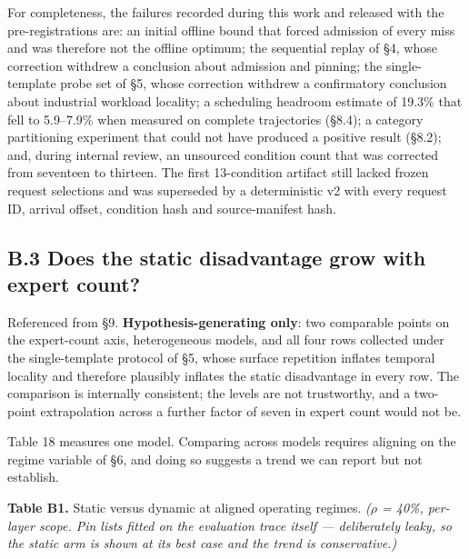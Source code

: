 \documentclass[
  10pt,
  letterpaper,
  10pt]{article}
\begin{document}
For completeness, the failures recorded during this work and released
with the pre-registrations are: an initial offline bound that forced
admission of every miss and was therefore not the offline optimum; the
sequential replay of §4, whose correction withdrew a conclusion about
admission and pinning; the single-template probe set of §5, whose
correction withdrew a confirmatory conclusion about industrial workload
locality; a scheduling headroom estimate of 19.3\% that fell to
5.9--7.9\% when measured on complete trajectories (§8.4); a category
partitioning experiment that could not have produced a positive result
(§8.2); and, during internal review, an unsourced condition count that
was corrected from seventeen to thirteen. The first 13-condition
artifact still lacked frozen request selections and was superseded by a
deterministic v2 with every request ID, arrival offset, condition hash
and source-manifest hash.

\subsection{B.3 Does the static disadvantage grow with expert
count?}\label{b.3-does-the-static-disadvantage-grow-with-expert-count}

Referenced from §9. \textbf{Hypothesis-generating only}: two comparable
points on the expert-count axis, heterogeneous models, and all four rows
collected under the single-template protocol of §5, whose surface
repetition inflates temporal locality and therefore plausibly inflates
the static disadvantage in every row. The comparison is internally
consistent; the levels are not trustworthy, and a two-point
extrapolation across a further factor of seven in expert count would not
be.

Table 18 measures one model. Comparing across models requires aligning
on the regime variable of §6, and doing so suggests a trend we can
report but not establish.

\textbf{Table B1.} Static versus dynamic at aligned operating regimes.
\emph{(\(\rho\) = 40\%, per-layer scope. Pin lists fitted on the
evaluation trace itself --- deliberately leaky, so the static arm is
shown at its best case and the trend is conservative.)}
\end{document}

